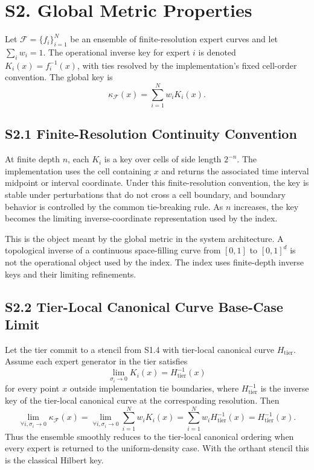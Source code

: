 \documentclass[11pt]{article}
\newcommand{\kappaf}{\kappa_{\mathcal F}}
\begin{document}
\section*{S2. Global Metric Properties}
\label{sec:si-global-metric}

Let $\mathcal F=\{f_i\}_{i=1}^N$ be an ensemble of finite-resolution expert curves and let $\sum_iw_i=1$. The operational inverse key for expert $i$ is denoted $K_i(x)=f_i^{-1}(x)$, with ties resolved by the implementation's fixed cell-order convention. The global key is
\[
\kappaf(x)=\sum_{i=1}^N w_iK_i(x).
\]

\subsection*{S2.1 Finite-Resolution Continuity Convention}
At finite depth $n$, each $K_i$ is a key over cells of side length $2^{-n}$. The implementation uses the cell containing $x$ and returns the associated time interval midpoint or interval coordinate. Under this finite-resolution convention, the key is stable under perturbations that do not cross a cell boundary, and boundary behavior is controlled by the common tie-breaking rule. As $n$ increases, the key becomes the limiting inverse-coordinate representation used by the index.

This is the object meant by the global metric in the system architecture. A topological inverse of a continuous space-filling curve from $[0,1]$ to $[0,1]^d$ is not the operational object used by the index. The index uses finite-depth inverse keys and their limiting refinements.

\subsection*{S2.2 Tier-Local Canonical Curve Base-Case Limit}
Let the tier commit to a stencil from S1.4 with tier-local canonical curve $H_{\mathrm{tier}}$. Assume each expert generator in the tier satisfies
\[
\lim_{\sigma_i\to0} K_i(x)=H_{\mathrm{tier}}^{-1}(x)
\]
for every point $x$ outside implementation tie boundaries, where $H_{\mathrm{tier}}^{-1}$ is the inverse key of the tier-local canonical curve at the corresponding resolution. Then
\[
\lim_{\forall i,\sigma_i\to0}\kappaf(x)
=\lim_{\forall i,\sigma_i\to0}\sum_{i=1}^Nw_iK_i(x)
=\sum_{i=1}^Nw_iH_{\mathrm{tier}}^{-1}(x)
=H_{\mathrm{tier}}^{-1}(x).
\]
Thus the ensemble smoothly reduces to the tier-local canonical ordering when every expert is returned to the uniform-density case. With the orthant stencil this is the classical Hilbert key.
\end{document}
